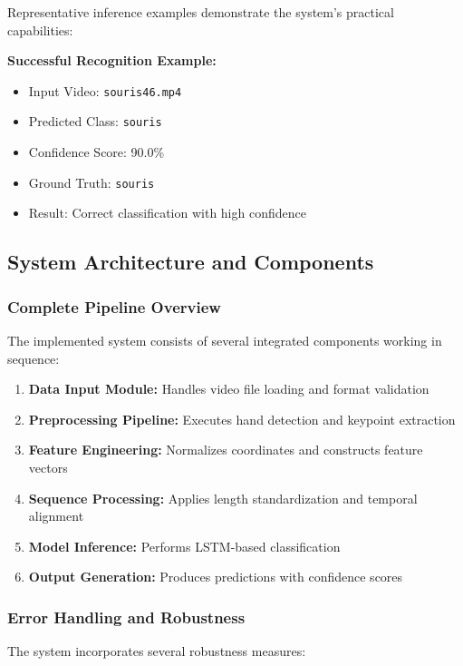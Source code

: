 \documentclass[11pt, a4paper]{article}
\begin{document}
Representative inference examples demonstrate the system's practical capabilities:

\textbf{Successful Recognition Example:}
\begin{itemize}
    \item Input Video: \texttt{souris46.mp4}
    \item Predicted Class: \texttt{souris}
    \item Confidence Score: 90.0\%
    \item Ground Truth: \texttt{souris}
    \item Result: Correct classification with high confidence
\end{itemize}

\subsection{System Architecture and Components}

\subsubsection{Complete Pipeline Overview}

The implemented system consists of several integrated components working in sequence:

\begin{enumerate}
    \item \textbf{Data Input Module:} Handles video file loading and format validation
    \item \textbf{Preprocessing Pipeline:} Executes hand detection and keypoint extraction
    \item \textbf{Feature Engineering:} Normalizes coordinates and constructs feature vectors
    \item \textbf{Sequence Processing:} Applies length standardization and temporal alignment
    \item \textbf{Model Inference:} Performs LSTM-based classification
    \item \textbf{Output Generation:} Produces predictions with confidence scores
\end{enumerate}

\subsubsection{Error Handling and Robustness}

The system incorporates several robustness measures:
\end{document}
